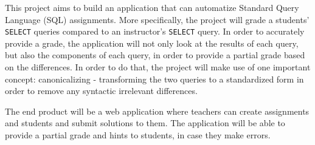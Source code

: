 This project aims to build an application that can automatize Standard Query Language (SQL) assignments. More specifically, the project will grade a students' \texttt{SELECT} queries compared to an instructor's \texttt{SELECT} query. In order to accurately provide a grade, the application will not only look at the results of each query, but also the components of each query, in order to provide a partial grade based on the differences. In order to do that, the project will make use of one important concept: canonicalizing - transforming the two queries to a standardized form in order to remove any syntactic irrelevant differences.

The end product will be a web application where teachers can create assignments and students and submit solutions to them. The application will be able to provide a partial grade and hints to students, in case they make errors.